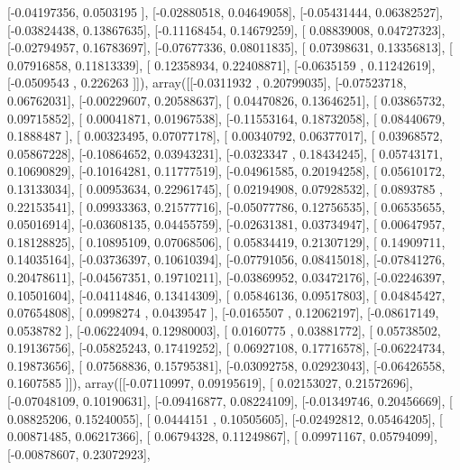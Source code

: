 \documentclass{article}
\begin{document}
       [-0.04197356,  0.0503195 ],
       [-0.02880518,  0.04649058],
       [-0.05431444,  0.06382527],
       [-0.03824438,  0.13867635],
       [-0.11168454,  0.14679259],
       [ 0.08839008,  0.04727323],
       [-0.02794957,  0.16783697],
       [-0.07677336,  0.08011835],
       [ 0.07398631,  0.13356813],
       [ 0.07916858,  0.11813339],
       [ 0.12358934,  0.22408871],
       [-0.0635159 ,  0.11242619],
       [-0.0509543 ,  0.226263  ]]), array([[-0.0311932 ,  0.20799035],
       [-0.07523718,  0.06762031],
       [-0.00229607,  0.20588637],
       [ 0.04470826,  0.13646251],
       [ 0.03865732,  0.09715852],
       [ 0.00041871,  0.01967538],
       [-0.11553164,  0.18732058],
       [ 0.08440679,  0.1888487 ],
       [ 0.00323495,  0.07077178],
       [ 0.00340792,  0.06377017],
       [ 0.03968572,  0.05867228],
       [-0.10864652,  0.03943231],
       [-0.0323347 ,  0.18434245],
       [ 0.05743171,  0.10690829],
       [-0.10164281,  0.11777519],
       [-0.04961585,  0.20194258],
       [ 0.05610172,  0.13133034],
       [ 0.00953634,  0.22961745],
       [ 0.02194908,  0.07928532],
       [ 0.0893785 ,  0.22153541],
       [ 0.09933363,  0.21577716],
       [-0.05077786,  0.12756535],
       [ 0.06535655,  0.05016914],
       [-0.03608135,  0.04455759],
       [-0.02631381,  0.03734947],
       [ 0.00647957,  0.18128825],
       [ 0.10895109,  0.07068506],
       [ 0.05834419,  0.21307129],
       [ 0.14909711,  0.14035164],
       [-0.03736397,  0.10610394],
       [-0.07791056,  0.08415018],
       [-0.07841276,  0.20478611],
       [-0.04567351,  0.19710211],
       [-0.03869952,  0.03472176],
       [-0.02246397,  0.10501604],
       [-0.04114846,  0.13414309],
       [ 0.05846136,  0.09517803],
       [ 0.04845427,  0.07654808],
       [ 0.0998274 ,  0.0439547 ],
       [-0.0165507 ,  0.12062197],
       [-0.08617149,  0.0538782 ],
       [-0.06224094,  0.12980003],
       [ 0.0160775 ,  0.03881772],
       [ 0.05738502,  0.19136756],
       [-0.05825243,  0.17419252],
       [ 0.06927108,  0.17716578],
       [-0.06224734,  0.19873656],
       [ 0.07568836,  0.15795381],
       [-0.03092758,  0.02923043],
       [-0.06426558,  0.1607585 ]]), array([[-0.07110997,  0.09195619],
       [ 0.02153027,  0.21572696],
       [-0.07048109,  0.10190631],
       [-0.09416877,  0.08224109],
       [-0.01349746,  0.20456669],
       [ 0.08825206,  0.15240055],
       [ 0.0444151 ,  0.10505605],
       [-0.02492812,  0.05464205],
       [ 0.00871485,  0.06217366],
       [ 0.06794328,  0.11249867],
       [ 0.09971167,  0.05794099],
       [-0.00878607,  0.23072923],
\end{document}

